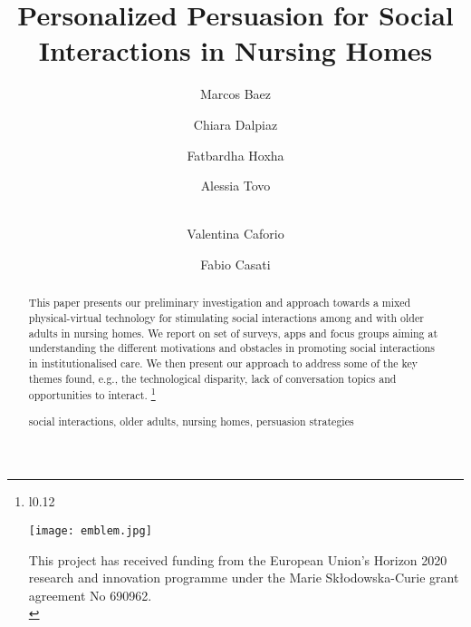 \documentclass[runningheads,a4paper,oribibl]{llncs}
\newcommand{\keywords}[1]{\par\addvspace\baselineskip
\noindent\keywordname\enspace\ignorespaces#1}
\newcommand\blfootnote[1]{\begingroup
  \renewcommand\thefootnote{}\footnote{#1}\addtocounter{footnote}{-1}\endgroup
}
\begin{document}
\mainmatter  

\title{Personalized Persuasion for Social Interactions in Nursing Homes}


\author{Marcos Baez\and Chiara Dalpiaz\and Fatbardha Hoxha\and Alessia Tovo\and \\
Valentina Caforio \and Fabio Casati}







\maketitle

\begin{abstract}
This paper presents our preliminary investigation and approach towards a mixed physical-virtual technology for stimulating social interactions among and with older adults in nursing homes. We report on set of surveys, apps and focus groups aiming at understanding the different motivations and obstacles in promoting social interactions in institutionalised care. We then present our approach to address some of the key themes found, e.g., the technological disparity, lack of conversation topics and opportunities to interact.\blfootnote{
\begin{wrapfigure}{l}{0.12\textwidth}
  \vspace{-44pt}
  \begin{center}
    \texttt{[image: emblem.jpg]}
  \end{center}
    \vspace{-30pt}
\end{wrapfigure}
{\fontfamily{cmss}\selectfont
\noindent This project has received funding from the European Union's Horizon 2020 research and innovation programme under the Marie Skłodowska-Curie grant agreement No 690962. \\
}
}

\keywords{social interactions, older adults, nursing homes, persuasion strategies}
\end{abstract}
\end{document}
